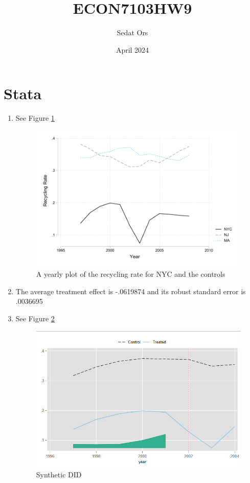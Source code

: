 \documentclass{article}
\title{ECON7103HW9}
\author{Sedat Ors}
\date{April 2024}
\begin{document}
\maketitle

\section{Stata}

\vspace{0.5cm}

\begin{enumerate}

\item  See Figure \ref{fig:Q1}
\begin{figure}[Ht]
    \centering
     \includegraphics{HWQ1.pdf}
    \caption{A yearly plot of the recycling rate for NYC and the controls}
    \label{fig:Q1}
\end{figure}

\item The average treatment effect is -.0619874 and its robust standard error is .0036695 

\item  See Figure  \ref{fig:Q3}

\begin{figure}[Ht]
    \centering
    \includegraphics[width=\textwidth]{HW9Q3.png}
    \caption{Synthetic DID}
    \label{fig:Q3}
\end{figure}


\end{enumerate}
\end{document}
